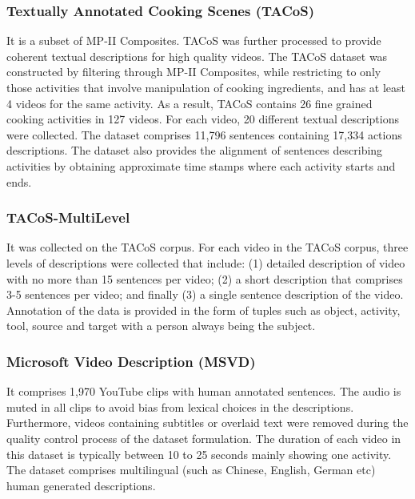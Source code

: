 \subsubsection{Textually Annotated Cooking Scenes (TACoS)}

\par It is a subset of MP-II Composites. TACoS was further processed to provide coherent textual descriptions for high quality videos. The TACoS dataset was constructed by filtering through MP-II Composites, while restricting to only those activities that involve manipulation of cooking ingredients, and has at least 4 videos for the same activity. As a result, TACoS contains 26 fine grained cooking activities in 127 videos. For each video, 20 different textual descriptions were collected. The dataset comprises 11,796 sentences containing 17,334 actions descriptions. The dataset also provides the alignment of sentences describing activities by obtaining approximate time stamps where each activity starts and ends.

\subsubsection{TACoS-MultiLevel}

\par It was collected on the TACoS corpus. For each video in the TACoS corpus, three levels of descriptions were collected that include: (1) detailed description of video with no more than 15 sentences per video; (2) a short description that comprises 3-5 sentences per video; and finally (3) a single sentence description of the video. Annotation of the data is provided in the form of tuples such as object, activity, tool, source and target with a person always being the subject.


\subsubsection{Microsoft Video Description (MSVD)}

\par It comprises 1,970 YouTube clips with human annotated sentences. The audio is muted in all clips to avoid bias from lexical choices in the descriptions. Furthermore, videos containing subtitles or overlaid text were removed during the quality control process of the dataset formulation. The duration of each video in this dataset is typically between 10 to 25 seconds mainly showing one activity. The dataset comprises multilingual (such as Chinese, English, German etc) human generated descriptions.


